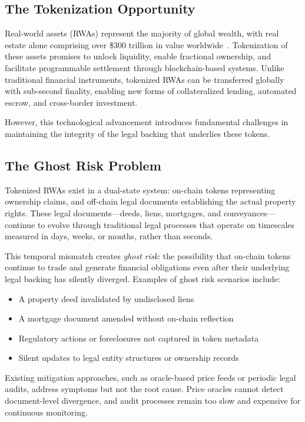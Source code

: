 \documentclass[10pt,conference]{IEEEtran}
\begin{document}
\subsection{The Tokenization Opportunity}
\label{subsec:tokenization_opportunity}

Real-world assets (RWAs) represent the majority of global wealth, with real estate alone comprising over \$300 trillion in value worldwide~\cite{savills2023}. Tokenization of these assets promises to unlock liquidity, enable fractional ownership, and facilitate programmable settlement through blockchain-based systems. Unlike traditional financial instruments, tokenized RWAs can be transferred globally with sub-second finality, enabling new forms of collateralized lending, automated escrow, and cross-border investment.

However, this technological advancement introduces fundamental challenges in maintaining the integrity of the legal backing that underlies these tokens.

\subsection{The Ghost Risk Problem}
\label{subsec:ghost_risk}

Tokenized RWAs exist in a dual-state system: on-chain tokens representing ownership claims, and off-chain legal documents establishing the actual property rights. These legal documents—deeds, liens, mortgages, and conveyances—continue to evolve through traditional legal processes that operate on timescales measured in days, weeks, or months, rather than seconds.

This temporal mismatch creates \textit{ghost risk}: the possibility that on-chain tokens continue to trade and generate financial obligations even after their underlying legal backing has silently diverged. Examples of ghost risk scenarios include:

\begin{itemize}
\item A property deed invalidated by undisclosed liens
\item A mortgage document amended without on-chain reflection
\item Regulatory actions or foreclosures not captured in token metadata
\item Silent updates to legal entity structures or ownership records
\end{itemize}

Existing mitigation approaches, such as oracle-based price feeds or periodic legal audits, address symptoms but not the root cause. Price oracles cannot detect document-level divergence, and audit processes remain too slow and expensive for continuous monitoring.
\end{document}
